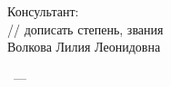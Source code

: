 \vspace{0pt plus4fill} %
\begin{flushright}%
    Консультант: \\
    // дописать степень, звания \\
    Волкова Лилия Леонидовна \\
\end{flushright}%

\vspace{0pt plus4fill} %
\begin{center}%
    {\thesisCity~--- \thesisYear}
\end{center}%

\newpage
